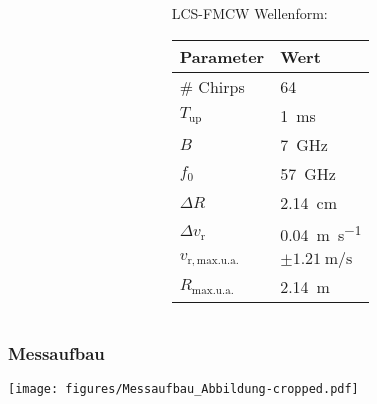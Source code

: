 \documentclass[16pt]{beamer}
\begin{document}
\begin{frame}
\begin{columns}
\begin{column}[t]{5.4cm}
	\end{column}
	\begin{column}[t]{4cm}
			LCS-FMCW Wellenform: \\
			\vspace{0.2cm}
			\begin{tabular}{|P{1.6cm}|P{2cm}|}
				\hline
				Parameter & Wert \\
				\hline\hline
				\# Chirps & 64 \\
				\hline
				$T_{\mathrm{up}}$ & \SI{1}{\milli\second} \\
				\hline
				$B$ & \SI{7}{\giga\hertz} \\
				\hline
				$f_{0}$ & \SI{57}{\giga\hertz} \\
				\hline
				$\Delta R$ & \SI{2,14}{\centi\meter} \\
				\hline
				$\Delta v_{\mathrm{r}}$ & \SI{0,04}{\meter\per\second} \\
				\hline
				$v_{\mathrm{r,max. u.a.}}$ & $\pm\SI{1,21}{\meter\per\second}$ \\
				\hline
				$R_{\mathrm{max. u.a.}}$ & \SI{2,14}{\meter} \\
				\hline
			\end{tabular}			
	\end{column}
\end{columns}
\end{frame}

\begin{frame}
	\frametitle{Messaufbau}
	\begin{center}
		\texttt{[image: figures/Messaufbau\_Abbildung-cropped.pdf]}
	\end{center}
\end{frame}
\end{document}
